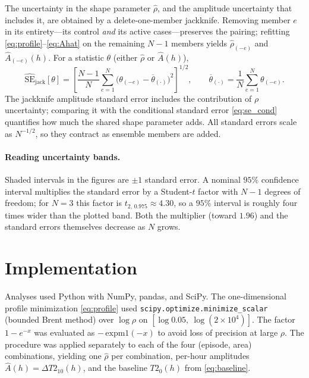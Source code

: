 \documentclass[11pt]{article}
\begin{document}
The uncertainty in the shape parameter $\widehat{\rho}$, and the amplitude
uncertainty that includes it, are obtained by a delete-one-member jackknife.
Removing member $e$ in its entirety---its control \emph{and} its active
cases---preserves the pairing; refitting \eqref{eq:profile}--\eqref{eq:Ahat} on the
remaining $N-1$ members yields $\widehat{\rho}_{(-e)}$ and
$\widehat{A}_{(-e)}(h)$. For a statistic $\theta$ (either $\widehat{\rho}$ or
$\widehat{A}(h)$),
\begin{equation}
  \widehat{\mathrm{SE}}_{\mathrm{jack}}[\theta]
  = \left[\frac{N-1}{N}\sum_{e=1}^{N}
     \big(\theta_{(-e)}-\overline{\theta}_{(\cdot)}\big)^2\right]^{1/2},
  \qquad
  \overline{\theta}_{(\cdot)}=\frac{1}{N}\sum_{e=1}^{N}\theta_{(-e)}.
  \label{eq:jack}
\end{equation}
The jackknife amplitude standard error includes the contribution of $\rho$
uncertainty; comparing it with the conditional standard error \eqref{eq:se_cond}
quantifies how much the shared shape parameter adds. All standard errors scale as
$N^{-1/2}$, so they contract as ensemble members are added.

\paragraph{Reading uncertainty bands.} Shaded intervals in the figures are
$\pm 1$ standard error. A nominal $95\%$ confidence interval multiplies the
standard error by a Student-$t$ factor with $N-1$ degrees of freedom; for $N=3$
this factor is $t_{2,\,0.975}\approx 4.30$, so a $95\%$ interval is roughly four
times wider than the plotted band. Both the multiplier (toward $1.96$) and the
standard errors themselves decrease as $N$ grows.

\section{Implementation}

Analyses used Python with NumPy, pandas, and SciPy. The one-dimensional profile
minimization \eqref{eq:profile} used \texttt{scipy.optimize.minimize\_scalar}
(bounded Brent method) over $\log\rho$ on $[\log 0.05,\ \log(2\times10^{4})]$. The
factor $1-e^{-x}$ was evaluated as $-\,\mathrm{expm1}(-x)$ to avoid loss of
precision at large $\rho$. The procedure was applied separately to each of the
four (episode, area) combinations, yielding one $\widehat{\rho}$ per combination,
per-hour amplitudes $\widehat{A}(h)=\Delta T2_{10}(h)$, and the baseline
$T2_0(h)$ from \eqref{eq:baseline}.
\end{document}
